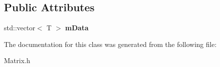 \subsection*{Public Attributes}
\begin{DoxyCompactItemize}
\item 
\hypertarget{classkeycpp_1_1matrix_ae2144abe57757c5a29e73aaf4d3520aa}{std\-::vector$<$ T $>$ {\bfseries m\-Data}}\label{classkeycpp_1_1matrix_ae2144abe57757c5a29e73aaf4d3520aa}

\end{DoxyCompactItemize}


The documentation for this class was generated from the following file\-:\begin{DoxyCompactItemize}
\item 
Matrix.\-h\end{DoxyCompactItemize}
